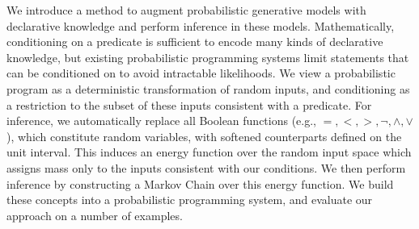 We introduce a method to augment probabilistic generative models with declarative knowledge and perform inference in these models.
Mathematically, conditioning on a predicate is sufficient to encode many kinds of declarative knowledge, but existing probabilistic programming systems limit statements that can be conditioned on to avoid intractable likelihoods.
We view a probabilistic program as a deterministic transformation of random inputs, and conditioning as a restriction to the subset of these inputs consistent with a predicate. For inference, we automatically replace all Boolean functions (e.g., $=, <, >, \neg, \land, \lor$), which constitute random variables, with softened counterparts defined on the unit interval.  This induces an energy function over the random input space which assigns mass only to the inputs consistent with our conditions.
We then perform inference by constructing a Markov Chain over this energy function.
We build these concepts into a probabilistic programming system, and evaluate our approach on a number of examples.